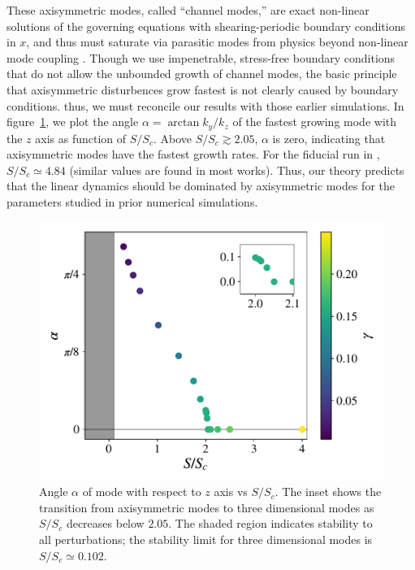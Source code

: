 \documentclass[aps,prl,reprint,superscriptaddress]{revtex4-1}
\newcommand{\SSC}{S/S_{c}}
\begin{document}
These axisymmetric modes, called ``channel modes,'' are exact non-linear solutions of the governing equations with shearing-periodic boundary conditions in $x$, and thus must saturate via parasitic modes from physics beyond non-linear mode coupling \citep{1994ApJ...432..213G}.
Though we use impenetrable, stress-free boundary conditions that do not allow the unbounded growth of channel modes, the basic principle that axisymmetric disturbences grow fastest is not clearly caused by boundary conditions.
thus, we must reconcile our results with those earlier simulations.
In figure~\ref{fig:alpha}, we plot the angle $\alpha = \arctan k_y/k_z$ of the fastest growing mode with the $z$ axis as function of $\SSC$.
Above $\SSC \gtrsim 2.05$, $\alpha$ is zero, indicating that axisymmetric modes have the fastest growth rates.
For the fiducial run in \citet{1996ApJ...464..690H}, $\SSC \simeq 4.84$ (similar values are found in most works).
Thus, our theory predicts that the linear dynamics should be dominated by axisymmetric modes for the parameters studied in prior numerical simulations.
%
\begin{figure}[h!]
  \includegraphics[width=\columnwidth]{alpha_vs_ssc_grid.pdf}
  \caption{Angle $\alpha$ of mode with respect to $z$ axis vs $\SSC$. The inset shows the transition from axisymmetric modes to three dimensional modes as $\SSC$ decreases below $2.05$. The shaded region indicates stability to all perturbations; the stability limit for three dimensional modes is $\SSC \simeq 0.102$.}
  \label{fig:alpha}
\end{figure}
%
\end{document}
